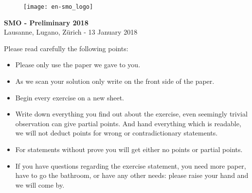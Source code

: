 \documentclass[12pt,a4paper]{article}
\begin{document}
\thispagestyle{empty}
\begin{figure}[h]
\texttt{[image: en-smo\_logo]}
\end{figure}

\vspace{1cm}

\begin{center}
\Huge{\textbf{SMO - Preliminary 2018}}\\[1.5cm]
\large{Lausanne, Lugano, Zürich - 13 January 2018}\\[2.5cm]
\end{center}



Please read carefully the following points:

\begin{itemize}
\item Please only use the paper we gave to you.

\item As we scan your solution only write on the front side of the paper.

\item Begin every exercise on a new sheet.

\item Write down everything you find out about the exercise, even seemingly trivial observation can give partial points. And hand everything which is readable, we will not deduct points for wrong or contradictionary statements. 

\item For statements without prove you will get either no points or partial points.


\item If you have questions regarding the exercise statement, you need more paper, have to go the bathroom, or have any other needs: please raise your hand and we will come by.



\end{itemize}
\end{document}
